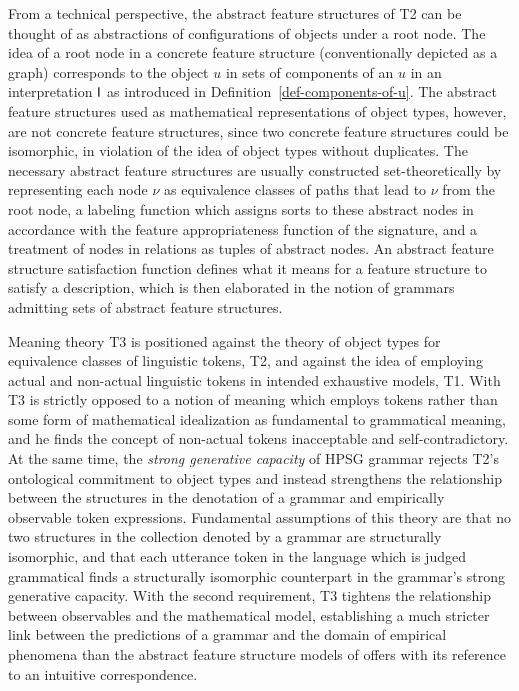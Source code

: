 \documentclass[output=paper
                ,modfonts
                ,nonflat
	        ,collection
	        ,collectionchapter
	        ,collectiontoclongg
 	        ,biblatex
                ,babelshorthands
                ,newtxmath
                ,draftmode
                ,colorlinks, citecolor=brown
]{./langsci/langscibook}
\begin{document}
{From a technical perspective, the abstract feature structures of T2
can be thought of as abstractions of configurations of objects under a
root node. The idea of a root node in a concrete feature structure
(conventionally depicted as a graph) corresponds to the object
$u$ in sets of components of an $u$ in an interpretation $\mathsf{I}$ as
introduced in Definition~\ref{def-components-of-u}. The abstract
feature structures used as mathematical representations of object
types, however, are not concrete feature structures, since two
concrete feature structures could be isomorphic, in violation of the
idea of object types without duplicates. The necessary abstract
feature structures are usually constructed set-theoretically by
representing each node $\nu$ as equivalence classes of paths that lead to
$\nu$ from the root node, a labeling function which assigns sorts to
these abstract nodes in accordance with the feature appropriateness
function of the signature, and a treatment of nodes in relations as
tuples of abstract nodes. An abstract feature structure satisfaction
function defines what it means for a feature structure to satisfy a
description, which is then elaborated in
the notion of grammars admitting sets of abstract
feature structures.

Meaning theory T3 is positioned against the theory of object types for
equivalence classes of linguistic tokens, T2, and against the idea of
employing actual and non-actual linguistic tokens in intended
exhaustive models, T1. With T3 \cite{Pollard99a} is strictly opposed
to a notion of meaning which employs tokens rather than some form
of mathematical idealization as fundamental to grammatical meaning,
and he finds the concept of non-actual tokens inacceptable and
self-contradictory. At the same time, the \emph{strong generative
  capacity} of HPSG grammar rejects T2's ontological commitment to
object types and instead strengthens the relationship between the
structures in the denotation of a grammar and empirically observable
token expressions. Fundamental assumptions of this theory are that no
two structures in the collection denoted by a grammar are structurally
isomorphic, and that each utterance token in the language which is
judged grammatical finds a structurally isomorphic counterpart in the
grammar's strong generative capacity. With the second requirement, T3
tightens the relationship between observables and the mathematical model,
establishing a much stricter link between the predictions of a grammar
and the domain of empirical phenomena than the abstract feature
structure models of \cite{PollardSag1994} offers with its reference
to an intuitive correspondence.

}
\end{document}

